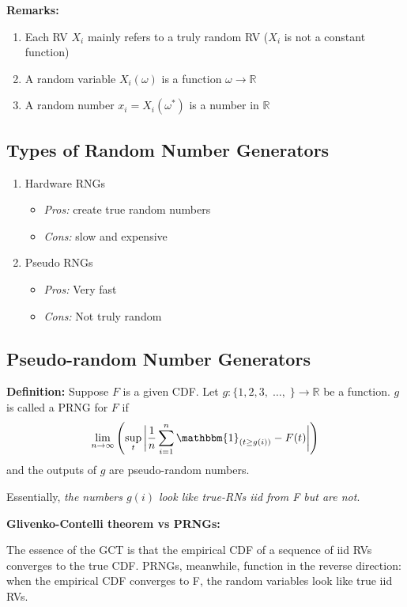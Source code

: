 \documentclass[12pt]{article}
\newcommand{\R}{\mathbb{R}}
\newcommand{\ind}{\mathbbm{1}}
\newcommand{\ellipsis}{\; \dots, \;}
\begin{document}
\textbf{Remarks:}
\begin{enumerate}
    \item Each RV $X_i$ mainly refers to a truly random RV ($X_i$ is not a constant function)
    \item A random variable $X_i(\omega)$ is a function $\omega \to \R$
    \item A random number $x_i = X_i(\omega^*)$ is a number in $\R$
\end{enumerate}

\subsection{Types of Random Number Generators}
\begin{enumerate}
    \item Hardware RNGs
    \begin{itemize}
        \item \emph{Pros:} create true random numbers
        \item \emph{Cons:} slow and expensive
    \end{itemize}

    \item Pseudo RNGs
    \begin{itemize}
        \item \emph{Pros:} Very fast 
        \item \emph{Cons:} Not truly random
    \end{itemize}
\end{enumerate}

\subsection{Pseudo-random Number Generators}
\textbf{Definition:} Suppose $F$ is a given CDF. Let $g: \{1, 2, 3, \ellipsis\} \to \R$ be a function. $g$ is called a PRNG for $F$ if 
\[\lim_{n\to \infty} \left(\sup_t\bigg \vert \frac{1}{n}\sum_{i=1}^n \ind_{(t \geq g(i))} - F(t) \bigg \vert\right)\]
and the outputs of $g$ are pseudo-random numbers.

Essentially, \emph{the numbers $g(i)$ look like true-RNs iid from F but are not}.

\textbf{Glivenko-Contelli theorem vs PRNGs:}

The essence of the GCT is that the empirical CDF of a sequence of iid RVs converges to the true CDF. PRNGs, meanwhile, function in the reverse direction: when the empirical CDF converges to F, the random variables look like true iid RVs. 
\end{document}
